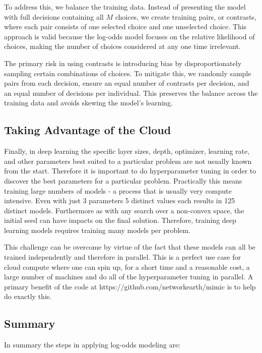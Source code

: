 \documentclass[11pt]{article}
\begin{document}
To address this, we balance the training data. Instead of presenting the model with full decisions containing all $M$ choices, we create training pairs, or contrasts, where each pair consists of one selected choice and one unselected choice. This approach is valid because the log-odds model focuses on the relative likelihood of choices, making the number of choices considered at any one time irrelevant.

The primary risk in using contrasts is introducing bias by disproportionately sampling certain combinations of choices. To mitigate this, we randomly sample pairs from each decision, ensure an equal number of contrasts per decision, and an equal number of decisions per individual. This preserves the balance across the training data and avoids skewing the model's learning.

\subsection*{Taking Advantage of the Cloud}

Finally, in deep learning the specific layer sizes, depth, optimizer, learning rate, and other parameters best suited to a particular problem are not usually known from the start. Therefore it is important to do hyperparameter tuning in order to discover the best parameters for a particular problem. Practically this means training large numbers of models - a process that is usually very compute intensive. Even with just 3 parameters 5 distinct values each results in 125 distinct models. Furthermore as with any search over a non-convex space, the initial seed can have impacts on the final solution. Therefore, training deep learning models requires training many models per problem.

This challenge can be overcome by virtue of the fact that these models can all be trained independently and therefore in parallel. This is a perfect use case for cloud compute where one can spin up, for a short time and a reasonable cost, a large number of machines and do all of the hyperparameter tuning in parallel. A primary benefit of the code at https://github.com/networkearth/mimic is to help do exactly this. 

\subsection*{Summary}

In summary the steps in applying log-odds modeling are:
\end{document}

